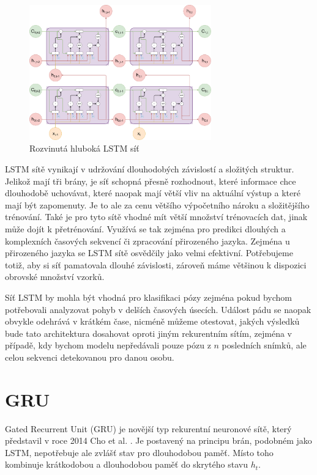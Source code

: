 \begin{figure}
    \centering
    \includegraphics[width=0.70\textwidth]{Figures/LSTM_deep.pdf}
    \caption{Rozvinutá hluboká LSTM síť}
    \label{fig:lstm_deep}
\end{figure}

LSTM sítě vynikají v udržování dlouhodobých závislostí a složitých struktur.
Jelikož mají tři brány, je síť schopná přesně rozhodnout, které informace chce
dlouhodobě uchovávat, které naopak mají větší vliv na aktuální výstup a které
mají být zapomenuty. Je to ale za cenu většího výpočetního nároku a
složitějšího trénování. Také je pro tyto sítě vhodné mít větší množství
trénovacích dat, jinak může dojít k přetrénování. Využívá se tak zejména pro
predikci dlouhých a komplexních časových sekvencí či zpracování přirozeného
jazyka. Zejména u přirozeného jazyka se LSTM sítě osvědčily jako velmi
efektivní. Potřebujeme totiž, aby si síť pamatovala dlouhé závislosti, zároveň
máme většinou k dispozici obrovské množství vzorků.

Síť LSTM by mohla být vhodná pro klasifikaci pózy zejména pokud bychom
potřebovali analyzovat pohyb v delších časových úsecích. Událost pádu se naopak
obvykle odehrává v krátkém čase, nicméně můžeme otestovat, jakých výsledků bude
tato architektura dosahovat oproti jiným rekurentním sítím, zejména v případě,
kdy bychom modelu nepředávali pouze pózu z $n$ posledních snímků, ale celou
sekvenci detekovanou pro danou osobu.

\section{GRU}

Gated Recurrent Unit (GRU) je novější typ rekurentní neuronové sítě, který
představil v roce 2014 Cho et al. \cite{gru}. Je postavený na principu brán,
podobném jako LSTM, nepotřebuje ale zvlášť stav pro dlouhodobou paměť. Místo
toho kombinuje krátkodobou a dlouhodobou paměť do skrytého stavu $h_t$.

